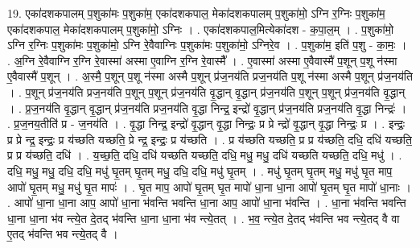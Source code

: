\documentclass[17pt]{extarticle}
\begin{document}
19. एका॑दशकपालम् प॒शुका॑मः प॒शुका॑म॒ एका॑दशकपाल॒ मेका॑दशकपालम् प॒शुका॑मो॒ ऽग्नि र॒ग्निः प॒शुका॑म॒ एका॑दशकपाल॒ मेका॑दशकपालम् प॒शुका॑मो॒ ऽग्निः । . एका॑दशकपाल॒मित्येका॑दश - क॒पा॒ल॒म् । . प॒शुका॑मो॒ ऽग्नि र॒ग्निः प॒शुका॑मः प॒शुका॑मो॒ ऽग्नि रे॒वैवाग्निः प॒शुका॑मः प॒शुका॑मो॒ ऽग्निरे॒व । . प॒शुका॑म॒ इति॑ प॒शु - का॒मः॒ । . अ॒ग्नि रे॒वैवाग्नि र॒ग्नि रे॒वास्मा॑ अस्मा ए॒वाग्नि र॒ग्नि रे॒वास्मै᳚ । . ए॒वास्मा॑ अस्मा ए॒वैवास्मै॑ प॒शून् प॒शू न॑स्मा ए॒वैवास्मै॑ प॒शून् । . अ॒स्मै॒ प॒शून् प॒शू न॑स्मा अस्मै प॒शून् प्र॑ज॒नय॑ति प्रज॒नय॑ति प॒शू न॑स्मा अस्मै प॒शून् प्र॑ज॒नय॑ति । . प॒शून् प्र॑ज॒नय॑ति प्रज॒नय॑ति प॒शून् प॒शून् प्र॑ज॒नय॑ति वृ॒द्धान् वृ॒द्धान् प्र॑ज॒नय॑ति प॒शून् प॒शून् प्र॑ज॒नय॑ति वृ॒द्धान् । . प्र॒ज॒नय॑ति वृ॒द्धान् वृ॒द्धान् प्र॑ज॒नय॑ति प्रज॒नय॑ति वृ॒द्धा निन्द्र॒ इन्द्रो॑ वृ॒द्धान् प्र॑ज॒नय॑ति प्रज॒नय॑ति वृ॒द्धा निन्द्रः॑ । . प्र॒ज॒नय॒तीति॑ प्र - ज॒नय॑ति । . वृ॒द्धा निन्द्र॒ इन्द्रो॑ वृ॒द्धान् वृ॒द्धा निन्द्रः॒ प्र प्रे न्द्रो॑ वृ॒द्धान् वृ॒द्धा निन्द्रः॒ प्र । . इन्द्रः॒ प्र प्रे न्द्र॒ इन्द्रः॒ प्र य॑च्छति यच्छति॒ प्रे न्द्र॒ इन्द्रः॒ प्र य॑च्छति । . प्र य॑च्छति यच्छति॒ प्र प्र य॑च्छति॒ दधि॒ दधि॑ यच्छति॒ प्र प्र य॑च्छति॒ दधि॑ । . य॒च्छ॒ति॒ दधि॒ दधि॑ यच्छति यच्छति॒ दधि॒ मधु॒ मधु॒ दधि॑ यच्छति यच्छति॒ दधि॒ मधु॑ । . दधि॒ मधु॒ मधु॒ दधि॒ दधि॒ मधु॑ घृ॒तम् घृ॒तम् मधु॒ दधि॒ दधि॒ मधु॑ घृ॒तम् । . मधु॑ घृ॒तम् घृ॒तम् मधु॒ मधु॑ घृ॒त माप॒ आपो॑ घृ॒तम् मधु॒ मधु॑ घृ॒त मापः॑ । . घृ॒त माप॒ आपो॑ घृ॒तम् घृ॒त मापो॑ धा॒ना धा॒ना आपो॑ घृ॒तम् घृ॒त मापो॑ धा॒नाः । . आपो॑ धा॒ना धा॒ना आप॒ आपो॑ धा॒ना भ॑वन्ति भवन्ति धा॒ना आप॒ आपो॑ धा॒ना भ॑वन्ति । . धा॒ना भ॑वन्ति भवन्ति धा॒ना धा॒ना भ॑व न्त्ये॒त दे॒तद् भ॑वन्ति धा॒ना धा॒ना भ॑व न्त्ये॒तत् । . भ॒व॒ न्त्ये॒त दे॒तद् भ॑वन्ति भव न्त्ये॒तद् वै वा ए॒तद् भ॑वन्ति भव न्त्ये॒तद् वै । \newline
\end{document}

